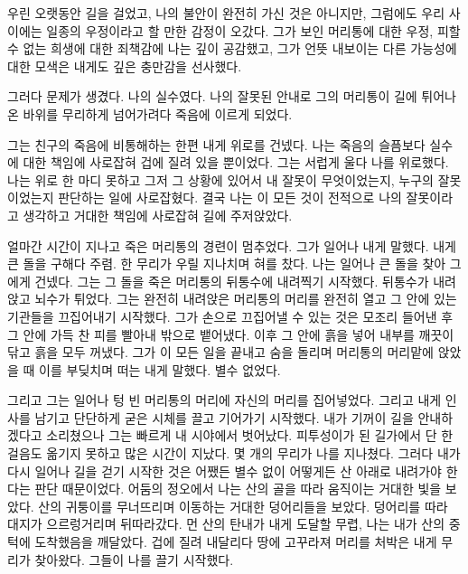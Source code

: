 \begin{article}
우린 오랫동안 길을 걸었고, 나의 불안이 완전히 가신 것은 아니지만, 그럼에도 우리 사이에는 일종의 우정이라고 할 만한 감정이 오갔다. 그가 보인 머리통에 대한 우정, 피할 수 없는 희생에 대한 죄책감에 나는 깊이 공감했고, 그가 언뜻 내보이는 다른 가능성에 대한 모색은 내게도 깊은 충만감을 선사했다.

그러다 문제가 생겼다. 나의 실수였다. 나의 잘못된 안내로 그의 머리통이 길에 튀어나온 바위를 무리하게 넘어가려다 죽음에 이르게 되었다.

그는 친구의 죽음에 비통해하는 한편 내게 위로를 건넸다. 나는 죽음의 슬픔보다 실수에 대한 책임에 사로잡혀 겁에 질려 있을 뿐이었다. 그는 서럽게 울다 나를 위로했다. 나는 위로 한 마디 못하고 그저 그 상황에 있어서 내 잘못이 무엇이었는지, 누구의 잘못이었는지 판단하는 일에 사로잡혔다. 결국 나는 이 모든 것이 전적으로 나의 잘못이라고 생각하고 거대한 책임에 사로잡혀 길에 주저앉았다.

얼마간 시간이 지나고 죽은 머리통의 경련이 멈추었다. 그가 일어나 내게 말했다. 내게 큰 돌을 구해다 주렴. 한 무리가 우릴 지나치며 혀를 찼다. 나는 일어나 큰 돌을 찾아 그에게 건넸다. 그는 그 돌을 죽은 머리통의 뒤통수에 내려찍기 시작했다. 뒤통수가 내려앉고 뇌수가 튀었다. 그는 완전히 내려앉은 머리통의 머리를 완전히 열고 그 안에 있는 기관들을 끄집어내기 시작했다. 그가 손으로 끄집어낼 수 있는 것은 모조리 들어낸 후 그 안에 가득 찬 피를 빨아내 밖으로 뱉어냈다. 이후 그 안에 흙을 넣어 내부를 깨끗이 닦고 흙을 모두 꺼냈다. 그가 이 모든 일을 끝내고 숨을 돌리며 머리통의 머리맡에 앉았을 때 이를 부딪치며 떠는 내게 말했다. 별수 없었다.

그리고 그는 일어나 텅 빈 머리통의 머리에 자신의 머리를 집어넣었다. 그리고 내게 인사를 남기고 단단하게 굳은 시체를 끌고 기어가기 시작했다. 내가 기꺼이 길을 안내하겠다고 소리쳤으나 그는 빠르게 내 시야에서 벗어났다. 피투성이가 된 길가에서 단 한 걸음도 옮기지 못하고 많은 시간이 지났다. 몇 개의 무리가 나를 지나쳤다. 그러다 내가 다시 일어나 길을 걷기 시작한 것은 어쨌든 별수 없이 어떻게든 산 아래로 내려가야 한다는 판단 때문이었다. 어둠의 정오에서 나는 산의 골을 따라 움직이는 거대한 빛을 보았다. 산의 귀퉁이를 무너뜨리며 이동하는 거대한 덩어리들을 보았다. 덩어리를 따라 대지가 으르렁거리며 뒤따라갔다. 먼 산의 탄내가 내게 도달할 무렵, 나는 내가 산의 중턱에 도착했음을 깨달았다. 겁에 질려 내달리다 땅에 고꾸라져 머리를 처박은 내게 무리가 찾아왔다. 그들이 나를 끌기 시작했다.
\end{article}

